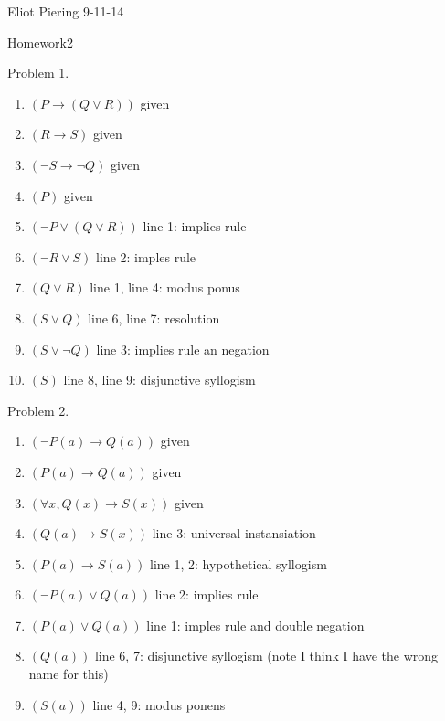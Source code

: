 \documentclass[10pt]{article}
\begin{document}
\hfill Eliot Piering
\hfill 9-11-14 

\center Homework2

\noindent Problem 1.

\begin{enumerate}
	\item $( P \longrightarrow (Q \vee R))$ given
	\item $( R \longrightarrow S)$ given
	\item $( \neg S \longrightarrow \neg Q)$ given 
	\item $( P )$ given
	\item $( \neg P \vee (Q \vee R) )$ line 1: implies rule
	\item $( \neg R \vee S )$ line 2: imples rule 
	\item $( Q \vee R )$ line 1, line 4: modus ponus
	\item $( S \vee Q )$ line 6, line 7: resolution
	\item $( S \vee \neg Q )$ line 3: implies rule an negation 
\item $( S )$ line 8, line 9: disjunctive syllogism  

\end{enumerate}

\item Problem 2.
\begin{enumerate}
	\item $( \neg P(a) \longrightarrow Q(a) )$	given 
	\item $( P(a) \longrightarrow Q(a) )$		given 
	\item $( \forall x, Q(x) \longrightarrow S(x))$ given 
	\item $( Q(a) \longrightarrow S(x) )$		line 3: universal instansiation 
	\item $( P(a) \longrightarrow S(a) )$		line 1, 2: hypothetical syllogism
	\item $( \neg P(a) \vee Q(a))$			line 2: implies rule
	\item $( P(a) \vee Q(a) )$			line 1: imples rule and double negation
	\item $( Q(a) )$				line 6, 7: disjunctive syllogism (note I think I have the wrong name for this) 
	\item $( S(a) )$				line 4, 9: modus ponens 
\end{enumerate}
\end{document}
